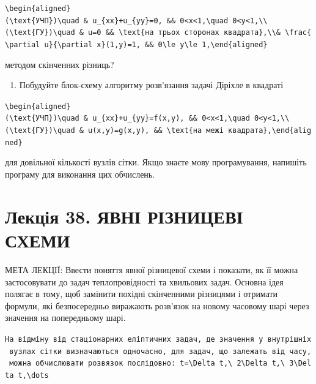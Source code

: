 \documentclass[
  ukrainian,
]{article}
\providecommand{\tightlist}{%
  \setlength{\itemsep}{0pt}\setlength{\parskip}{0pt}}
\begin{document}
\texttt{\textbackslash{}begin\{aligned\}(\textbackslash{}text\{УЧП\})\textbackslash{}quad\ \&\ u\_\{xx\}+u\_\{yy\}=0,\ \&\&\ 0\textless{}x\textless{}1,\textbackslash{}quad\ 0\textless{}y\textless{}1,\textbackslash{}\textbackslash{}(\textbackslash{}text\{ГУ\})\textbackslash{}quad\ \&\ u=0\ \&\&\ \textbackslash{}text\{на\ трьох\ сторонах\ квадрата\},\textbackslash{}\textbackslash{}\&\ \textbackslash{}frac\{\textbackslash{}partial\ u\}\{\textbackslash{}partial\ x\}(1,y)=1,\ \&\&\ 0\textbackslash{}le\ y\textbackslash{}le\ 1,\textbackslash{}end\{aligned\}}

методом скінченних різниць?

\begin{enumerate}
\def\labelenumi{\arabic{enumi}.}
\setcounter{enumi}{5}
\tightlist
\item
  Побудуйте блок-схему алгоритму розв'язання задачі Діріхле в квадраті
\end{enumerate}

\texttt{\textbackslash{}begin\{aligned\}(\textbackslash{}text\{УЧП\})\textbackslash{}quad\ \&\ u\_\{xx\}+u\_\{yy\}=f(x,y),\ \&\&\ 0\textless{}x\textless{}1,\textbackslash{}quad\ 0\textless{}y\textless{}1,\textbackslash{}\textbackslash{}(\textbackslash{}text\{ГУ\})\textbackslash{}quad\ \&\ u(x,y)=g(x,y),\ \&\&\ \textbackslash{}text\{на\ межі\ квадрата\},\textbackslash{}end\{aligned\}}

для довільної кількості вузлів сітки. Якщо знаєте мову програмування,
напишіть програму для виконання цих обчислень.

\section{Лекція 38. ЯВНІ РІЗНИЦЕВІ
СХЕМИ}\label{ux43bux435ux43aux446ux456ux44f-38.-ux44fux432ux43dux456-ux440ux456ux437ux43dux438ux446ux435ux432ux456-ux441ux445ux435ux43cux438}

МЕТА ЛЕКЦІЇ: Ввести поняття явної різницевої схеми і показати, як її
можна застосовувати до задач теплопровідності та хвильових задач.
Основна ідея полягає в тому, щоб замінити похідні скінченними різницями
і отримати формули, які безпосередньо виражають розв'язок на новому
часовому шарі через значення на попередньому шарі.

\texttt{На\ відміну\ від\ стаціонарних\ еліптичних\ задач,\ де\ значення\ у\ внутрішніх\ вузлах\ сітки\ визначаються\ одночасно,\ для\ задач,\ що\ залежать\ від\ часу,\ можна\ обчислювати\ розв\textquotesingle{}язок\ послідовно:\ \textquotesingle{}t=\textbackslash{}Delta\ t,\textbackslash{}\ 2\textbackslash{}Delta\ t,\textbackslash{}\ 3\textbackslash{}Delta\ t,\textbackslash{}dots\textquotesingle{}}
\end{document}
